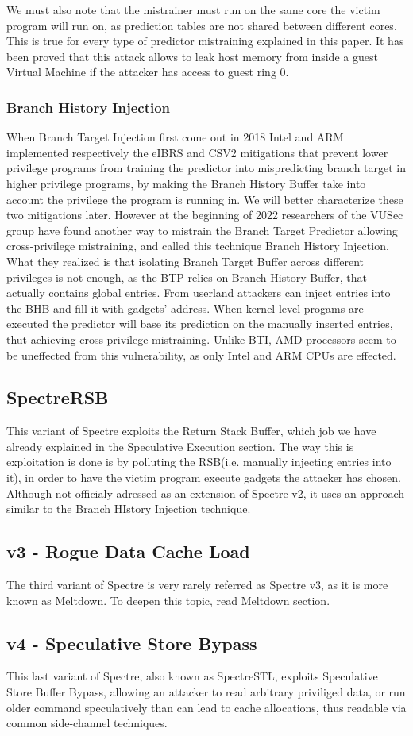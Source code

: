 We must also note that the mistrainer must run on the same core the victim program will run on, as prediction tables are not shared between different cores.
This is true for every type of predictor mistraining explained in this paper.
It has been proved that this attack allows to leak host memory from inside a guest Virtual Machine if the attacker has access to guest ring 0.

\subsubsection{Branch History Injection}
When Branch Target Injection first come out in 2018 Intel and ARM implemented respectively the eIBRS and CSV2 mitigations that prevent lower privilege programs from training the predictor into mispredicting branch target in higher privilege programs, by making the Branch History Buffer take into account the privilege the program is running in. 
We will better characterize these two mitigations later.
However at the beginning of 2022 researchers of the VUSec group have found another way to mistrain the Branch Target Predictor allowing cross-privilege mistraining, and called this technique Branch History Injection.
What they realized is that isolating Branch Target Buffer across different privileges is not enough, as the BTP relies on Branch History Buffer, that actually contains global entries.
From userland attackers can inject entries into the BHB and fill it with gadgets' address. When kernel-level progams are executed the predictor will base its prediction on the manually inserted entries, thut achieving cross-privilege mistraining.
Unlike BTI, AMD processors seem to be uneffected from this vulnerability, as only Intel and ARM CPUs are effected.

\subsection{SpectreRSB}
This variant of Spectre exploits the Return Stack Buffer, which job we have already explained in the Speculative Execution section.
The way this is exploitation is done is by polluting the RSB(i.e. manually injecting entries into it), in order to have the victim program execute gadgets the attacker has chosen.
Although not officialy adressed as an extension of Spectre v2, it uses an approach similar to the Branch HIstory Injection technique.

\subsection{v3 - Rogue Data Cache Load}
The third variant of Spectre is very rarely referred as Spectre v3, as it is more known as Meltdown. To deepen this topic, read Meltdown section.

\subsection{v4 - Speculative Store Bypass}
This last variant of Spectre, also known as SpectreSTL, exploits Speculative Store Buffer Bypass, allowing an attacker to read arbitrary priviliged data, or run older command speculatively than can lead to cache allocations, thus readable via common side-channel techniques.
